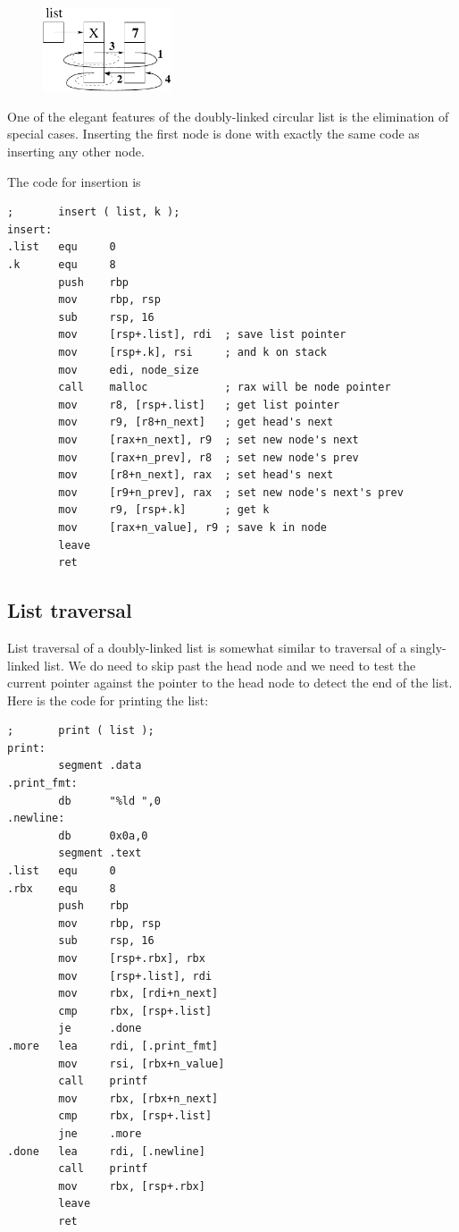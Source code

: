 \documentclass[11pt,b5paper]{book}
\begin{document}
\begin{figure}[h!]
\centering\includegraphics[width=1.5in]{insert_doubly_linked_list.pdf}
\end{figure}

One of the elegant features of the doubly-linked circular list is
the elimination of special cases.
Inserting the first node is done with exactly the same code as
inserting any other node.

The code for insertion is
\begin{verbatim}
;       insert ( list, k );
insert:
.list   equ     0
.k      equ     8
        push    rbp
        mov     rbp, rsp
        sub     rsp, 16
        mov     [rsp+.list], rdi  ; save list pointer
        mov     [rsp+.k], rsi     ; and k on stack
        mov     edi, node_size
        call    malloc            ; rax will be node pointer
        mov     r8, [rsp+.list]   ; get list pointer
        mov     r9, [r8+n_next]   ; get head's next
        mov     [rax+n_next], r9  ; set new node's next
        mov     [rax+n_prev], r8  ; set new node's prev
        mov     [r8+n_next], rax  ; set head's next
        mov     [r9+n_prev], rax  ; set new node's next's prev
        mov     r9, [rsp+.k]      ; get k
        mov     [rax+n_value], r9 ; save k in node
        leave
        ret
\end{verbatim}

\subsection{List traversal}

List traversal of a doubly-linked list is somewhat similar to
traversal of a singly-linked list.
We do need to skip past the head node and we need to test the
current pointer against the pointer to the head node to detect the
end of the list.
Here is the code for printing the list:
\begin{verbatim}
;       print ( list );
print:
        segment .data
.print_fmt:
        db      "%ld ",0
.newline:
        db      0x0a,0
        segment .text
.list   equ     0
.rbx    equ     8
        push    rbp
        mov     rbp, rsp
        sub     rsp, 16
        mov     [rsp+.rbx], rbx
        mov     [rsp+.list], rdi
        mov     rbx, [rdi+n_next]
        cmp     rbx, [rsp+.list]
        je      .done
.more   lea     rdi, [.print_fmt]
        mov     rsi, [rbx+n_value]
        call    printf
        mov     rbx, [rbx+n_next]
        cmp     rbx, [rsp+.list]
        jne     .more
.done   lea     rdi, [.newline]
        call    printf
        mov     rbx, [rsp+.rbx]
        leave
        ret
\end{verbatim}
\end{document}
